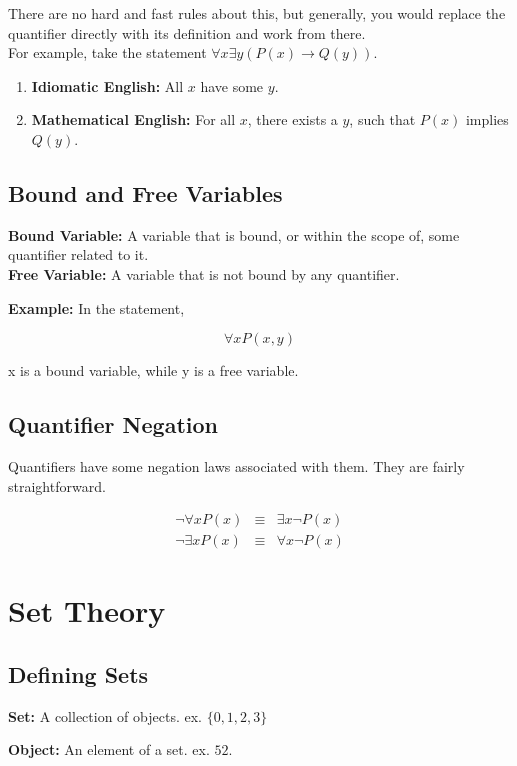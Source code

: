 \documentclass{article}
\begin{document}
\noindent There are no hard and fast rules about this, but generally, you would replace the quantifier
directly with its definition and work from there. \\

\noindent For example, take the statement $\forall x \exists y (P(x) \rightarrow Q(y))$.
\begin{enumerate}
    \item \textbf{Idiomatic English:} All $x$ have some $y$.
    \item \textbf{Mathematical English:} For all $x$, there exists a $y$, such that $P(x)$ implies $Q(y)$.
\end{enumerate}

\subsection{Bound and Free Variables}
\textbf{Bound Variable:} A variable that is bound, or within the scope of, some quantifier related to it. \\
\textbf{Free Variable:} A variable that is not bound by any quantifier.

\noindent \textbf{Example:} In the statement,

\[ \forall x P(x, y) \]

x is a bound variable, while y is a free variable.

\subsection{Quantifier Negation}
Quantifiers have some negation laws associated with them. They are fairly straightforward.

\begin{eqnarray}
    \neg \forall x P(x) &\equiv& \exists x \neg P(x) \\
    \neg \exists x P(x) &\equiv& \forall x \neg P(x)
\end{eqnarray}

\section{Set Theory}
\subsection{Defining Sets}
\textbf{Set:} A collection of objects. ex. $\{0, 1, 2, 3\}$

\noindent \textbf{Object:} An element of a set. ex. $52$.
\end{document}
